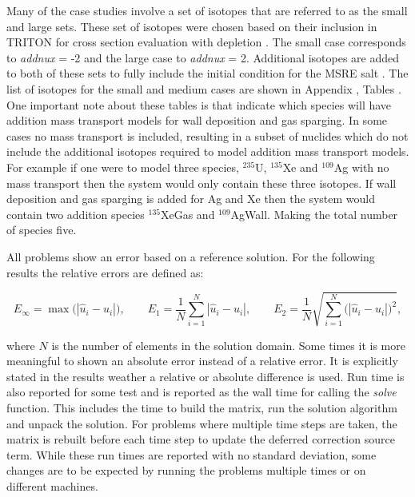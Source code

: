 Many of the case studies involve a set of isotopes that are referred to as the small and large sets. These set of isotopes were chosen based on their inclusion in TRITON for cross section evaluation with depletion \cite{scaleManual}. The small case corresponds to \textit{addnux} = -2 and the large case to \textit{addnux} = 2. Additional isotopes are added to both of these sets to fully include the initial condition for the MSRE salt \cite{MSREbenchmark}. The list of isotopes for the small and medium cases are shown in Appendix , Tables  . One important note about these tables is that indicate which species will have addition mass transport models for wall deposition and gas sparging. In some cases no mass transport is included, resulting in a subset of nuclides which do not include the additional isotopes required to model addition mass transport models. For example if one were to model three species, ${}^{235}$U, ${}^{135}$Xe and ${}^{109}$Ag with no mass transport then the system would only contain these three isotopes. If wall deposition and gas sparging is added for Ag and Xe then the system would contain two addition species ${}^{135}$XeGas and ${}^{109}$AgWall. Making the total number of species five. 

All problems show an error based on a reference solution. For the following results the relative errors are defined as:

\begin{equation*}
    E_{\infty} = \max\bigg(|\hat{u}_{i} - u_{i}|\bigg),  \quad \quad E_{1} = \frac{1}{N}\sum_{i=1}^{N}|\hat{u}_{i} - u_{i}|, \quad \quad E_{2} = \frac{1}{N}\sqrt{\sum_{i=1}^{N}\bigg(|\hat{u}_{i} - u_{i}|\bigg)^{2}},
\end{equation*}


\noindent where $N$ is the number of elements in the solution domain. Some times it is more meaningful to shown an absolute error instead of a relative error. It is explicitly stated in the results weather a relative or absolute difference is used. Run time is also reported for some test and is reported as the wall time for calling the \textit{solve} function. This includes the time to build the matrix, run the solution algorithm and unpack the solution. For problems where multiple time steps are taken, the matrix is rebuilt before each time step to update the deferred correction source term. While these run times are reported with no standard deviation, some changes are to be expected by running the problems multiple times or on different machines. 

